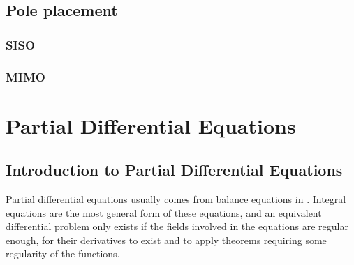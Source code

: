 \documentclass[letterpaper,10pt,english]{jupyterBook}
\begin{document}
\chapter{Pole placement}
\label{\detokenize{ch/control/pole-placement:pole-placement}}\label{\detokenize{ch/control/pole-placement:control-pole-placement}}\label{\detokenize{ch/control/pole-placement::doc}}

\section{SISO}
\label{\detokenize{ch/control/pole-placement:siso}}\label{\detokenize{ch/control/pole-placement:control-pole-placement-siso}}

\section{MIMO}
\label{\detokenize{ch/control/pole-placement:mimo}}\label{\detokenize{ch/control/pole-placement:control-pole-placement-mimo}}
\sphinxstepscope


\part{Partial Differential Equations}

\sphinxstepscope


\chapter{Introduction to Partial Differential Equations}
\label{\detokenize{ch/pde/intro:introduction-to-partial-differential-equations}}\label{\detokenize{ch/pde/intro:pde}}\label{\detokenize{ch/pde/intro::doc}}
\sphinxAtStartPar
Partial differential equations usually comes from balance equations in . Integral equations are the most general form of these equations, and an equivalent differential problem only exists if the fields involved in the equations are regular enough, for their derivatives to exist \sphinxhyphen{} and to apply theorems requiring some regularity of the functions.
\end{document}
